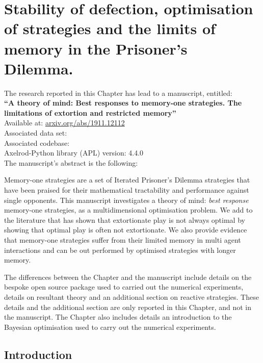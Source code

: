 
\chapter{Stability of defection, optimisation of strategies and the limits of
       memory in the Prisoner's Dilemma.}\label{chapter:memory_one}

\begin{center}
    The research reported in this Chapter has lead to a manuscript, entitled: \\
    \textbf{``A theory of mind: Best responses to memory-one strategies.
    The limitations of extortion and restricted memory''} \\
    Available at: \url{arxiv.org/abs/1911.12112} \\
    Associated data set: \cite{glynatsi2019} \\
    Associated codebase: \cite{Glynatsi2019_opt_mo} \\
    Axelrod-Python library (APL) version: 4.4.0 \\ \vspace{.5cm}
    The manuscript's abstract is the following:
\end{center}

Memory-one strategies are a set of Iterated Prisoner's Dilemma strategies that
have been praised for their mathematical tractability and performance against
single opponents. This manuscript investigates a theory of mind: \textit{best
response} memory-one strategies, as a multidimensional optimisation problem. We
add to the literature that has shown that extortionate play is not always
optimal by showing that optimal play is often not extortionate. We also provide
evidence that memory-one strategies suffer from their limited memory in multi
agent interactions and can be out performed by optimised strategies with longer
memory.

\hrulefill

The differences between the Chapter and the manuscript include details on the
bespoke open source package used to carried out the numerical experiments,
details on resultant theory and an additional section on reactive strategies.
These details and the additional section are only reported in this Chapter, and
not in the manuscript. The Chapter also includes details an introduction to the
Bayesian optimisation used to carry out the numerical experiments.

\section{Introduction}\label{section:mem_one_introduction}

